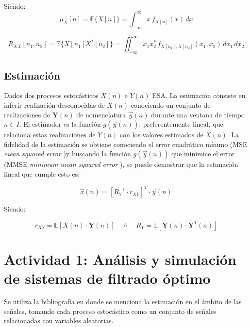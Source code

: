 \documentclass[a4paper]{article}
\begin{document}
Siendo:
\begin{equation}
	\mu_X[n] = \mathbb{E}\{X[n]\} = \int_{-\infty}^{\infty} x \, f_{X[n]}(x) \, dx
\end{equation}

\begin{equation}
	R_{XX}[n_1, n_2] = \mathbb{E}\{X[n_1] X^*[n_2]\} = \iint_{-\infty}^{\infty} x_1 x_2^* \, f_{X[n_1], X[n_2]}(x_1, x_2) \, dx_1 \, dx_2
\end{equation}



\subsection*{Estimación}

Dados dos procesos estocásticos $X(n)$ e $Y(n)$ ESA. La estimación consiste en inferir realización desconocidas de $X(n)$ conociendo un conjunto de realizaciones de $\textbf{Y}(n)$ de nomenclatura $\vec{y}(n)$ durante una ventana de tiempo $n \in I$. El estimador es la función $g(\vec{y}(n))$, preferentemente lineal, que relaciona estas realizaciones de $Y(n)$ con los valores estimados de $X(n)$. La fidelidad de la estimación se obtiene conociendo el error cuadrático mínimo (MSE \textit{mean squared error} )y buscando la función $g(\vec{y}(n))$ que minimice el error (MMSE \textit{minimum mean squared error} ), se puede demostrar que la estimación lineal que cumple esto es: 

\begin{equation}
	\hat{x}(n) = [R_Y^{-1} \cdot r_{XY}]^{T} \cdot \vec{y}(n)
\end{equation}

Siendo: 

\begin{equation}
	r_{XY} = \mathbb{E}[X(n)\cdot \textbf{Y}(n)]  \quad \wedge \quad R_{Y} = \mathbb{E}[\textbf{Y}(n)\cdot \textbf{Y}^T(n)]
\end{equation}


 \section*{Actividad 1: Análisis y simulación de sistemas de filtrado óptimo }
 
 Se utiliza la bibliografía \cite{hayes1996} en donde se menciona la estimación en el ámbito de las señales, tomando cada proceso estocástico como un conjunto de señales relacionadas con variables aleatorias. 
 
\end{document}
